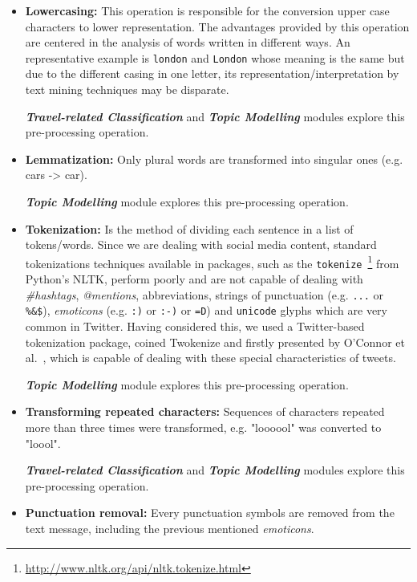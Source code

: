 \begin{itemize}
	\item \textbf{Lowercasing:} This operation is responsible for the conversion upper case characters to lower representation. The advantages provided by this operation are centered in the analysis of words written in different ways. An representative example is \texttt{london} and \texttt{London} whose meaning is the same but due to the different casing in one letter, its representation/interpretation by text mining techniques may be disparate.
	
	\textit{\textbf{Travel-related Classification}} and \textit{\textbf{Topic Modelling}} modules explore this pre-processing operation.
	
	\item \textbf{Lemmatization:} Only plural words are transformed into singular ones (e.g. cars -> car).
	
	\textit{\textbf{Topic Modelling}} module explores this pre-processing operation.
	
	\item \textbf{Tokenization:} Is the method of dividing each sentence in a list of tokens/words.
	Since we are dealing with social media content, standard tokenizations techniques available in packages, such as the \texttt{tokenize}~\footnote{\url{http://www.nltk.org/api/nltk.tokenize.html}} from Python's \gls{NLTK}, perform poorly and are not capable of dealing with \textit{\#hashtags}, \textit{@mentions}, abbreviations, strings of punctuation (e.g. \texttt{...} or \texttt{\%\&\/\$}), \textit{emoticons} (e.g. \texttt{:)} or \texttt{:-)} or \texttt{=D}) and \texttt{unicode} glyphs which are very common in Twitter. Having considered this, we used a Twitter-based tokenization package, coined Twokenize and firstly presented by O'Connor et al.~\cite{o2010tweetmotif}, which is capable of dealing with these special characteristics of tweets.
	
	\textit{\textbf{Topic Modelling}} module explores this pre-processing operation.
	
	\item \textbf{Transforming repeated characters:} Sequences of characters repeated more than three times were transformed, e.g. "loooool" was converted to "loool".
	
	\textit{\textbf{Travel-related Classification}} and \textit{\textbf{Topic Modelling}} modules explore this pre-processing operation.
	
	\item \textbf{Punctuation removal:} Every punctuation symbols are removed from the text message, including the previous mentioned \textit{emoticons}.
	

\end{itemize}
